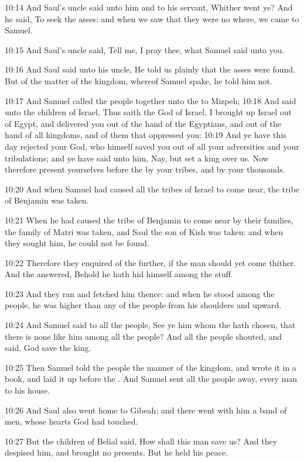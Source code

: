 10:14 And Saul's uncle said unto him and to his servant, Whither went ye?  And he said, To seek the asses: and when we saw that they were no where, we came to Samuel.

10:15 And Saul's uncle said, Tell me, I pray thee, what Samuel said unto you.

10:16 And Saul said unto his uncle, He told us plainly that the asses were found. But of the matter of the kingdom, whereof Samuel spake, he told him not.

10:17 And Samuel called the people together unto the \LORD to Mizpeh; 10:18 And said unto the children of Israel, Thus saith the \LORD God of Israel, I brought up Israel out of Egypt, and delivered you out of the hand of the Egyptians, and out of the hand of all kingdoms, and of them that oppressed you: 10:19 And ye have this day rejected your God, who himself saved you out of all your adversities and your tribulations; and ye have said unto him, Nay, but set a king over us.  Now therefore present yourselves before the \LORD by your tribes, and by your thousands.

10:20 And when Samuel had caused all the tribes of Israel to come near, the tribe of Benjamin was taken.

10:21 When he had caused the tribe of Benjamin to come near by their families, the family of Matri was taken, and Saul the son of Kish was taken: and when they sought him, he could not be found.

10:22 Therefore they enquired of the \LORD further, if the man should yet come thither. And the \LORD answered, Behold he hath hid himself among the stuff.

10:23 And they ran and fetched him thence: and when he stood among the people, he was higher than any of the people from his shoulders and upward.

10:24 And Samuel said to all the people, See ye him whom the \LORD hath chosen, that there is none like him among all the people? And all the people shouted, and said, God save the king.

10:25 Then Samuel told the people the manner of the kingdom, and wrote it in a book, and laid it up before the \LORD. And Samuel sent all the people away, every man to his house.

10:26 And Saul also went home to Gibeah; and there went with him a band of men, whose hearts God had touched.

10:27 But the children of Belial said, How shall this man save us? And they despised him, and brought no presents. But he held his peace.

